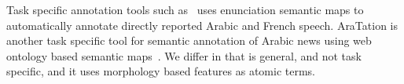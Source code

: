 Task specific annotation tools such as~\cite{alrahabi2006semantic}
uses enunciation semantic maps to automatically annotate 
directly reported Arabic and French speech. 
AraTation is another task specific tool for semantic annotation of 
Arabic news using web ontology based semantic maps~\cite{saleh2009aratation}.
We differ in that \framework is general, and not task specific, and it uses 
morphology based features as atomic terms. 